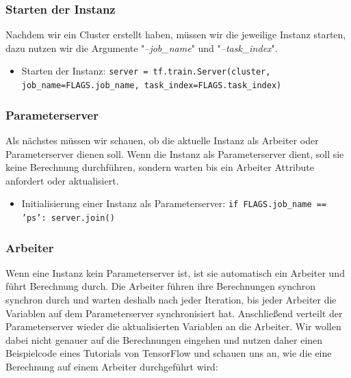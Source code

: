 \vspace{2mm}
\subsubsection{Starten der Instanz}
Nachdem wir ein Cluster erstellt haben, müssen wir die jeweilige Instanz starten, dazu nutzen wir die Argumente "\textit{--job\_name}" und "\textit{--task\_index}".
\begin{itemize}
	\item Starten der Instanz: \newline
		\texttt{server = tf.train.Server(cluster,
				job\_name=FLAGS.job\_name,	
				task\_index=FLAGS.task\_index)}
\end{itemize}

\vspace{2mm}
\subsubsection{Parameterserver}
Als nächstes müssen wir schauen, ob die aktuelle Instanz als Arbeiter oder Parameterserver dienen soll. Wenn die Instanz als Parameterserver dient, soll sie keine Berechnung durchführen, sondern warten bis ein Arbeiter Attribute anfordert oder aktualisiert.
\begin{itemize}
	\item Initialisierung einer Instanz als Parameterserver: \newline
		\texttt{if FLAGS.job\_name == 'ps': 
			server.join()}
\end{itemize}

\vspace{2mm}
\subsubsection{Arbeiter}
Wenn eine Instanz kein Parameterserver ist, ist sie automatisch ein Arbeiter und führt Berechnung durch. Die Arbeiter führen ihre Berechnungen synchron synchron durch und warten deshalb nach jeder Iteration, bis jeder Arbeiter die Variablen auf dem Parameterserver synchronisiert hat. Anschließend verteilt der Parameterserver wieder die aktualisierten Variablen an die Arbeiter. Wir wollen dabei nicht genauer auf die Berechnungen eingehen und nutzen daher einen Beispielcode eines Tutorials von TensorFlow und schauen uns an, wie die eine Berechnung auf einem Arbeiter durchgeführt wird:

